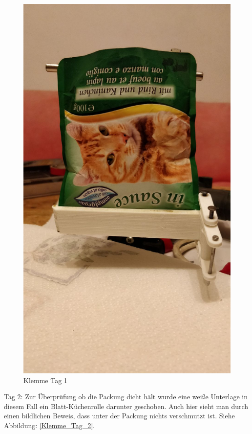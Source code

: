 \begin{figure}[H]
\begin{minipage}[hbt]{.3\linewidth}
      \includegraphics[width=\linewidth]{Bilder/Dichtheitsexperiment/Tag_1}
      \caption{Klemme Tag 1}
      \label{Klemme_Tag_1}
   \end{minipage}
\end{figure}

Tag 2: Zur Überprüfung ob die Packung dicht hält wurde eine weiße Unterlage in diesem Fall ein Blatt-Küchenrolle darunter geschoben. Auch hier sieht man durch einen bildlichen Beweis, dass unter der Packung nichts verschmutzt ist. Siehe Abbildung: \ref{Klemme_Tag_2}. \\

